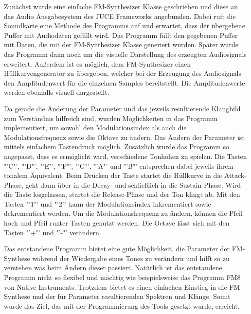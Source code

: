 Zunächst wurde eine einfache FM-Synthesizer Klasse geschrieben und diese an das Audio Ausgabesystem des JUCE Frameworks angebunden. Dabei ruft die Soundkarte eine Methode des Programms auf und erwartet, dass der übergebene Puffer mit Audiodaten gefüllt wird. Das Programm füllt den gegebenen Puffer mit Daten, die mit der FM-Synthesizer Klasse generiert wurden. Später wurde das Programm dann noch um die visuelle Darstellung des erzeugten Audiosignals erweitert. Außerdem ist es möglich, dem FM-Synthesizer einen Hüllkurvengenerator zu übergeben, welcher bei der Erzeugung des Audiosignals den Amplitudenwert für die einzelnen Samples bereitstellt. Die Amplitudenwerte werden ebenfalls visuell dargestellt.

Da gerade die Änderung der Parameter und das jeweils resultierende Klangbild zum Verständnis hilfreich sind, wurden Möglichkeiten in das Programm implementiert, um sowohl den Modulationsindex als auch die Modulationsfrequenz sowie die Oktave zu ändern. Das Ändern der Parameter ist mittels einfachem Tastendruck möglich. Zusätzlich wurde das Programm so angepasst, dass es ermöglicht wird, verschiedene Tonhöhen zu spielen. Die Tasten "'C"', "'D"', "'E"', "'F"', "'G"', "'A"' und "'B"' entsprechen dabei jeweils ihrem tonalem Äquivalent. Beim Drücken der Taste startet die Hüllkurve in die Attack-Phase, geht dann über in die Decay- und schließlich in die Sustain-Phase. Wird die Taste losgelassen, startet die Release-Phase und der Ton klingt ab. Mit den Tasten "'1"' und "'2"' kann der Modulationsindex inkrementiert sowie dekrementiert werden. Um die Modulationsfrequenz zu ändern, können die Pfeil hoch und Pfeil runter Tasten genutzt werden. Die Octave lässt sich mit den Tasten "'+"' und "'-"' verändern.

Das entstandene Programm bietet eine gute Möglichkeit, die Parameter der FM-Synthese während der Wiedergabe eines Tones zu verändern und hilft so zu verstehen was beim Ändern dieser passiert. Natürlich ist das entstandene Programm nicht so flexibel und mächtig wie beispielsweise das Programm FM8 von Native Instruments. Trotzdem bietet es einen einfachen Einstieg in die FM-Synthese und der für Parameter resultierenden Spektren und Klänge. Somit wurde das Ziel, das mit der Programmierung des Tools gesetzt wurde, erreicht.
\FloatBarrier
